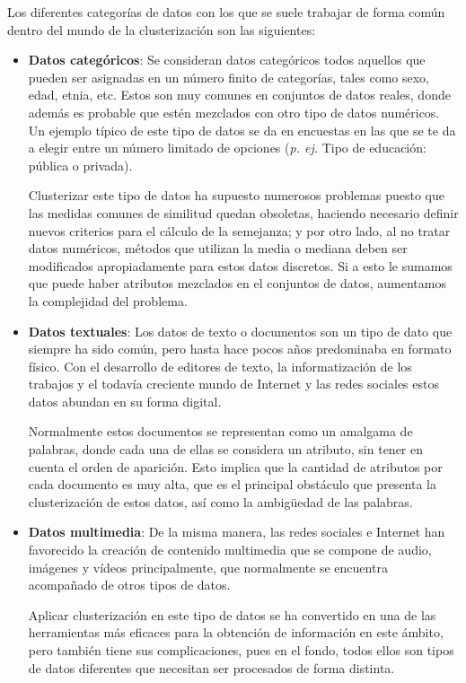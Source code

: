 \documentclass[10pt, a4paper]{article}
\begin{document}
Los diferentes categorías de datos con los que se suele trabajar de forma común dentro del mundo de la clusterización son las siguientes:

\begin{itemize}
  \item \textbf{Datos categóricos}: Se consideran datos categóricos todos aquellos que pueden ser asignadas en un número finito de categorías, tales como sexo, edad, etnia, etc. Estos son muy comunes en conjuntos de datos reales, donde además es probable que estén mezclados con otro tipo de datos numéricos.  Un ejemplo típico de este tipo de datos se da en encuestas en las que se te da a elegir entre un número limitado de opciones (\textit{p. ej.} Tipo de educación: pública o privada).
  
  Clusterizar este tipo de datos ha supuesto numerosos problemas puesto que las medidas comunes de similitud quedan obsoletas, haciendo necesario definir nuevos criterios para el cálculo de la semejanza; y por otro lado, al no tratar datos numéricos, métodos que utilizan la media o mediana deben ser modificados apropiadamente para estos datos discretos. Si a esto le sumamos que puede haber atributos mezclados en el conjuntos de datos, aumentamos la complejidad del problema.
  
  \item \textbf{Datos textuales}: Los datos de texto o documentos son un tipo de dato que siempre ha sido común, pero hasta hace pocos años predominaba en formato físico. Con el desarrollo de editores de texto, la informatización de los trabajos y el todavía creciente mundo de Internet y las redes sociales estos datos abundan en su forma digital.
  
  Normalmente estos documentos se representan como un amalgama de palabras, donde cada una de ellas se considera un atributo, sin tener en cuenta el orden de aparición. Esto implica que la cantidad de atributos por cada documento es muy alta, que es el principal obstáculo que presenta la clusterización de estos datos, así como la ambigüedad de las palabras. 
  
  \item \textbf{Datos multimedia}: De la misma manera, las redes sociales e Internet han favorecido la creación de contenido multimedia que se compone de audio, imágenes y vídeos principalmente, que normalmente se encuentra acompañado de otros tipos de datos.
  
  Aplicar clusterización en este tipo de datos se ha convertido en una de las herramientas más eficaces para la obtención de información en este ámbito, pero también tiene sus complicaciones, pues en el fondo, todos ellos son tipos de datos diferentes que necesitan ser procesados de forma distinta.
  

\end{itemize}
\end{document}
